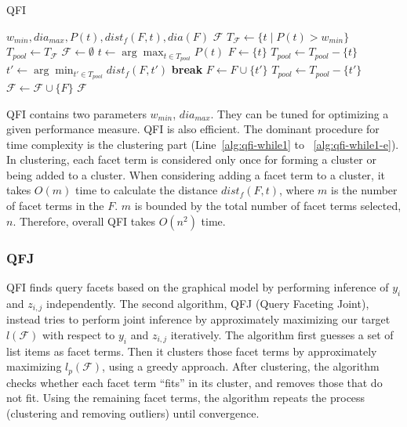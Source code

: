 \begin{algorithm}[ht!]
 \caption{QFI}
\label{alg:qfi}
\begin{algorithmic}[1]
  \Require $w_{min}, dia_{max}, P(t), dist_f(F,t), dia(F)$
  \Ensure $\mathcal{F}$
  \State $T_\mathcal{F} \leftarrow \{t\;|\;P(t)\!>\!w_{min}\}$ \label{alg:qfi-term}
  \State $T_{pool} \leftarrow T_\mathcal{F}$ \label{alg:qfi-pool}
  \State $\mathcal{F} \leftarrow \emptyset$ \label{alg:qfi-fempty}
   \label{alg:qfi-while1}
    \State $t \leftarrow \arg\!\max_{t\in T_{pool}}{P(t)}$ 
    \State $F \leftarrow \{t\}$
    \State $T_{pool}\leftarrow {T_{pool}}\!-\!\{t\}$
      \State $t' \leftarrow \arg\!\min_{t'\in T_{pool}}{dist_f(F,t')}$ \label{alg:qfi-closest}
       \label{alg:qfi-dia}
	\State \textbf{break}
      \EndIf
      \State $F \leftarrow F \cup \{t'\}$
      \State $T_{pool}\leftarrow {T_{pool}}\!-\!\{t'\}$
    \EndWhile
    \State $\mathcal{F} \leftarrow \mathcal{F} \cup \{F\}$ \label{alg:qfi-collect}
  \EndWhile \label{alg:qfi-while1-e}
  \State \Return $\mathcal{F}$ \label{alg:qfi-return}
\end{algorithmic}
\end{algorithm}

QFI contains two parameters $w_{min}$, $dia_{max}$. They can be tuned for optimizing a given performance measure. QFI is also efficient. The dominant procedure for time complexity is the clustering part (Line~\ref{alg:qfi-while1} to ~\ref{alg:qfi-while1-e}). In clustering, each facet term is considered only once for forming a cluster or being added to a cluster. When considering adding a facet term to a cluster, it takes $O(m)$ time to calculate the distance $dist_f(F,t)$, where $m$ is the number of facet terms in the $F$. $m$ is bounded by the total number of facet terms selected, $n$. Therefore, overall QFI takes $O(n^2)$ time.

\subsubsection{QFJ}
QFI finds query facets based on the graphical model by performing inference of $y_i$ and $z_{i,j}$ independently.
The second algorithm, QFJ (Query Faceting Joint), instead tries to perform joint inference by approximately maximizing our target $l(\mathcal{F})$ with respect to  $y_i$ and $z_{i,j}$ iteratively.
The algorithm first guesses a set of list items as facet terms.
Then it clusters those facet terms by approximately maximizing $l_p(\mathcal{F})$, using a greedy approach. 
After clustering, the algorithm checks whether each facet term ``fits'' in its cluster, and removes those that do not fit.
Using the remaining facet terms, the algorithm repeats the process (clustering and removing outliers) until convergence.

